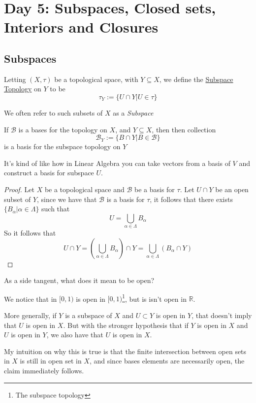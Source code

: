 \section{Day 5: Subspaces, Closed sets, Interiors and Closures}
\subsection{Subspaces}
\begin{definition}
    Letting $(X,\tau)$ be a topological space, with $Y\subseteq X$, we define the \href{https://en.wikipedia.org/wiki/Subspace_topology}{Subspace Topology} on $Y$ to be
    \[\tau_Y :=\{U\cap Y\vert U\in\tau\}\]    
\end{definition}
We often refer to such subsets of $X$ as a \textit{Subspace}
\begin{proposition}
    If $\mathscr{B}$ is a bases for the topology on $X$, and $Y\subseteq X$, then then collection
    \[\mathscr{B}_Y := \{B\cap Y\vert B\in\mathscr{B}\}\]
    is a basis for the subspace topology on $Y$
\end{proposition}
It's kind of like how in Linear Algebra you can take vectors from a basis of $V$ and construct a basis for subspace $U$.
\begin{proof}
    Let $X$ be a topological space and $\mathscr{B}$ be a basis for $\tau$. Let $U\cap Y$ be an open subset of $Y$, since we have that $\mathscr{B}$ is a basis for $\tau$, it follows that there exists $\{B_\alpha\vert\alpha\in\Lambda\}$ such that \[U=\bigcup_{\alpha\in\Lambda}B_\alpha\]
    So it follows that \[ U\cap Y=\left(\bigcup_{\alpha\in\Lambda}B_\alpha\right) \cap Y = \bigcup_{\alpha\in\Lambda}\left(B_\alpha\cap Y\right)\]
\end{proof}
\begin{remark}
    As a side tangent, what does it mean to be open?
\end{remark}
\begin{example}
    We notice that in $[0,1)$ is open in $[0,1)$\footnote{The subspace topology}, but is isn't open in $\mathbb{R}$.
\end{example}
More generally, if $Y$ is a subspace of $X$ and $U\subset Y$ is open in $Y$, that doesn't imply that $U$ is open in $X$. But with the stronger hypothesis that if $Y$ is open in $X$ and $U$ is open in $Y$, we also have that $U$ is open in $X$.
\begin{remark}
    My intuition on why this is true is that the finite intersection between open sets in $X$ is still in open set in $X$, and since bases elements are necessarily open, the claim immediately follows.
\end{remark}
